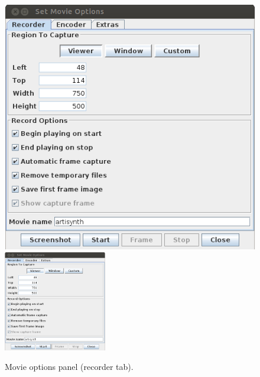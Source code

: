 \documentclass{article}
\begin{document}
\begin{figure}
\begin{center}
\iflatexml
\includegraphics[]{images/moviePanel}
\else
\includegraphics[width=0.40\textwidth]{images/moviePanel}
\fi
\end{center}
\caption{Movie options panel (recorder tab).}%
\label{movieOptionsRecorderFig}
\end{figure}
\end{document}
